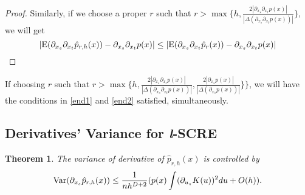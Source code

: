 \documentclass[aos,preprint]{imsart}
\newtheorem{theorem}{Theorem}[section]
\theoremstyle{remark}
\begin{document}
\begin{appendix}
\begin{proof}
Similarly, if we choose a proper $r$ such that $r>\max\{h,\frac{2|\partial_{x_s}\partial_{x_t} p(x)|}{ |\Delta(\partial_{x_s} \partial_{x_t}p(x))|}\}$, we will get
\begin{equation}\label{end2}
|{\rm E}( \partial_{x_s} \partial_{x_t} \hat{p}_{r,h}(x)) - \partial_{x_s} \partial_{x_t} p(x)| \leq |{\rm E}( \partial_{x_s}  \partial_{x_t} \hat{p}_{r}(x)) -  \partial_{x_s }\partial_{x_t} p(x)|
\end{equation}
\end{proof}
If choosing $r$ such that $ r>\max\{h,\frac{2|\partial_{x_s}\partial_{x_t} p(x)|}{ |\Delta(\partial_{x_s} \partial_{x_t}p(x))|}, \frac{2|\partial_{x_s} p(x)|}{ |\Delta(\partial_{x_s} p(x))|}\}\}$, we will have the conditions  in \eqref{end1} and \eqref{end2} satisfied, simultaneously.
\subsection{Derivatives' Variance for {\it l}-SCRE}
\begin{theorem}{The variance of derivative of $\hat{p}_{r,h}(x)$ is controlled by}
\[
{{\rm Var}}(\partial_{x_s} \hat{p}_{r,h}(x)) \leq \frac{1}{n h^{D+2}}  (p(x) \int (\partial_{ u_s } K (u) )^2   du + O(h)).
\]
\end{theorem}


\end{appendix}
\end{document}
